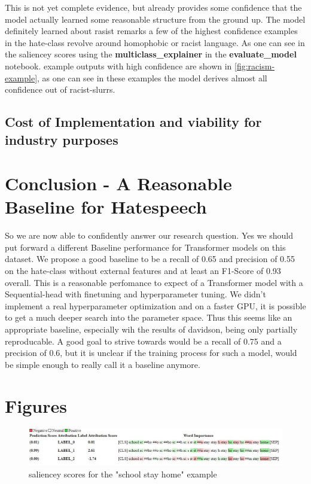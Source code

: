 \documentclass[11pt,a4paper]{article}
\begin{document}
This is not yet complete evidence, but already provides some confidence that the model actually learned some reasonable structure from the ground up.
The model definitely learned about rasist remarks a few of the highest confidence examples in the hate-class revolve around homophobic or racist language.
As one can see in the saliencey scores using the \textbf{multiclass\_explainer} in the \textbf{evaluate\_model} notebook.
example outputs with high confidence are shown in \ref{fig:racism-example},
as one can see in these examples the model derives almost all confidence out of racist-slurrs.

\subsection{Cost of Implementation and viability for industry purposes}

\section{Conclusion - A Reasonable Baseline for Hatespeech}
So we are now able to confidently answer our research question.
Yes we should put forward a different Baseline performance for Transformer models on this dataset.
We propose a good baseline to be a recall of 0.65 and precision of 0.55 on the hate-class without external features
 and at least an F1-Score of 0.93 overall.
This is a reasonable perfomance to expect of a Transformer model with a Sequential-head with finetuning
and hyperparameter tuning.
We didn't implement a real hyperparameter optimization and on a faster GPU, it is possible to get a much deeper search into
the parameter space. Thus this seems like an appropriate baseline, especially wih the results of davidson, being only partially reproducable.
A good goal to strive towards would be a recall of 0.75 and a precision of 0.6, but it is unclear if the training process for such a model, would 
be simple enough to really call it a baseline anymore.


\clearpage 
\appendix

\section{Figures}
\begin{figure}[!ht]
  \includegraphics[width=2\linewidth]{./tables-figures/school-confusion-viz.JPG} 
  \caption{saliencey scores for the "school stay home" example}
  \label{fig:school-saliency}
\end{figure}
\end{document}
